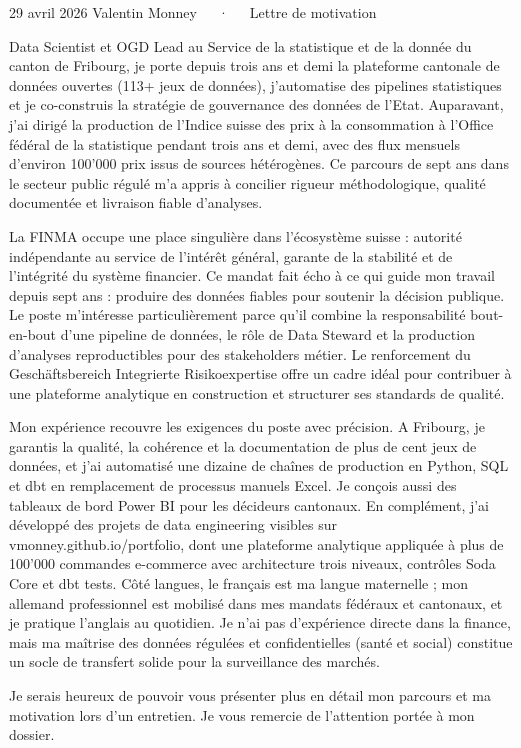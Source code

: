 \documentclass[11pt, a4paper]{awesome-cv}
\begin{document}
\makecvheader[R]
\makecvfooter
  {29 avril 2026}
  {Valentin Monney~~~·~~~Lettre de motivation}
  {}

\makelettertitle

\begin{cvletter}

Data Scientist et OGD Lead au Service de la statistique et de la donn\'ee du canton de Fribourg, je porte depuis trois ans et demi la plateforme cantonale de donn\'ees ouvertes (113+ jeux de donn\'ees), j'automatise des pipelines statistiques et je co-construis la strat\'egie de gouvernance des donn\'ees de l'Etat. Auparavant, j'ai dirig\'e la production de l'Indice suisse des prix \`a la consommation \`a l'Office f\'ed\'eral de la statistique pendant trois ans et demi, avec des flux mensuels d'environ 100'000 prix issus de sources h\'et\'erog\`enes. Ce parcours de sept ans dans le secteur public r\'egul\'e m'a appris \`a concilier rigueur m\'ethodologique, qualit\'e document\'ee et livraison fiable d'analyses.

La FINMA occupe une place singuli\`ere dans l'\'ecosyst\`eme suisse : autorit\'e ind\'ependante au service de l'int\'er\^et g\'en\'eral, garante de la stabilit\'e et de l'int\'egrit\'e du syst\`eme financier. Ce mandat fait \'echo \`a ce qui guide mon travail depuis sept ans : produire des donn\'ees fiables pour soutenir la d\'ecision publique. Le poste m'int\'eresse particuli\`erement parce qu'il combine la responsabilit\'e bout-en-bout d'une pipeline de donn\'ees, le r\^ole de Data Steward et la production d'analyses reproductibles pour des stakeholders m\'etier. Le renforcement du Gesch\"aftsbereich Integrierte Risikoexpertise offre un cadre id\'eal pour contribuer \`a une plateforme analytique en construction et structurer ses standards de qualit\'e.

Mon exp\'erience recouvre les exigences du poste avec pr\'ecision. A Fribourg, je garantis la qualit\'e, la coh\'erence et la documentation de plus de cent jeux de donn\'ees, et j'ai automatis\'e une dizaine de cha\^ines de production en Python, SQL et dbt en remplacement de processus manuels Excel. Je con\c cois aussi des tableaux de bord Power BI pour les d\'ecideurs cantonaux. En compl\'ement, j'ai d\'evelopp\'e des projets de data engineering visibles sur vmonney.github.io/portfolio, dont une plateforme analytique appliqu\'ee \`a plus de 100'000 commandes e-commerce avec architecture trois niveaux, contr\^oles Soda Core et dbt tests. C\^ot\'e langues, le fran\c cais est ma langue maternelle ; mon allemand professionnel est mobilis\'e dans mes mandats f\'ed\'eraux et cantonaux, et je pratique l'anglais au quotidien. Je n'ai pas d'exp\'erience directe dans la finance, mais ma ma\^itrise des donn\'ees r\'egul\'ees et confidentielles (sant\'e et social) constitue un socle de transfert solide pour la surveillance des march\'es.

Je serais heureux de pouvoir vous pr\'esenter plus en d\'etail mon parcours et ma motivation lors d'un entretien. Je vous remercie de l'attention port\'ee \`a mon dossier.

\end{cvletter}

\makeletterclosing
\end{document}
